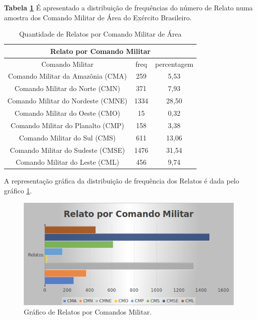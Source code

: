 \textbf{Tabela \ref{QuantidadeRelatos}} É apresentado a distribuição de frequências do número de Relato numa amostra dos Comando Militar de Área do Exército Brasileiro. 
\begin{table}[H]
\centering
\begin{tabular}{|c | c| c|} 
 \multicolumn{3}{c}{Relato por Comando Militar}\\ \hline
  Comando Militar & freq  & percentagem  \\ [0.5ex] 
 \hline
 Comando Militar da Amazônia (CMA) &  259 & 5,53\\ 
 \hline
 Comando Militar do Norte (CMN) &  371 & 7,93\\
 \hline
 Comando Militar do Nordeste (CMNE) &  1334 & 28,50\\
 \hline
 Comando Militar do Oeste (CMO) &  15 & 0,32\\
 \hline
 Comando Militar do Planalto (CMP) &  158 & 3,38\\
 \hline
 Comando Militar do Sul (CMS) &  611 & 13,06\\
 \hline
 Comando Militar do Sudeste (CMSE) &  1476 & 31,54\\
 \hline
 Comando Militar do Leste (CML) &  456 & 9,74\\ [1ex] 
 \hline
\end{tabular}
\caption{Quantidade de Relatos por Comando Militar de Área}
\label{QuantidadeRelatos}
\end{table}

A representação gráfica da distribuição de frequência dos Relatos é dada pelo gráfico \ref{figuraRelatos}.
\begin{figure}[H]
        \centering
        \includegraphics[width=1\textwidth]{Figuras/qtde_relatos.png}
        \caption{Gráfico de Relatos por Comandos Militar.}
        \label{figuraRelatos}
\end{figure}

